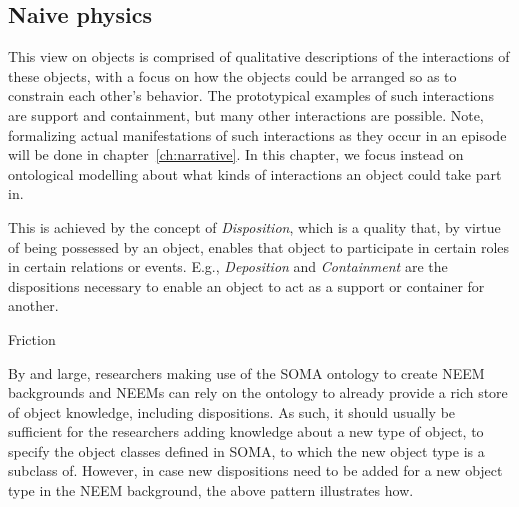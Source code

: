 \subsection{Naive physics}

This view on objects is comprised of qualitative descriptions of the interactions of these objects, with a focus on how the objects could be arranged so as to constrain each other's behavior. The prototypical examples of such interactions are support and containment, but many other interactions are possible. Note, formalizing actual manifestations of such interactions as they occur in an episode will be done in chapter~\ref{ch:narrative}. In this chapter, we focus instead on ontological modelling about what kinds of interactions an object could take part in. 

This is achieved by the concept of \emph{Disposition}, which is a quality that, by virtue of being possessed by an object, enables that object to participate in certain roles in certain relations or events. E.g., \emph{Deposition} and \emph{Containment} are the dispositions necessary to enable an object to act as a support or container for another.

\begin{ODP}{Friction}
\end{ODP}

By and large, researchers making use of the SOMA ontology to create NEEM backgrounds and NEEMs can rely on the ontology to already provide a rich store of object knowledge, including dispositions. As such, it should usually be sufficient for the researchers adding knowledge about a new type of object, to specify the object classes defined in SOMA, to which the new object type is a subclass of. However, in case new dispositions need to be added for a new object type in the NEEM background, the above pattern illustrates how.

